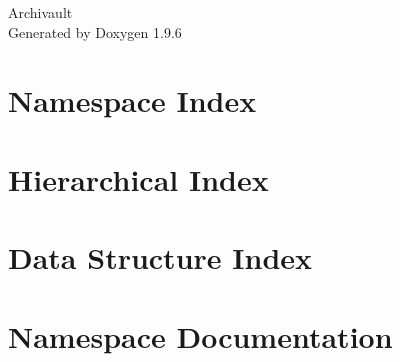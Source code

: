 \documentclass[twoside]{book}
\newcommand{\+}{\discretionary{\mbox{\scriptsize$\hookleftarrow$}}{}{}}
\newcommand{\clearemptydoublepage}{%
    \newpage{\pagestyle{empty}\cleardoublepage}%
  }
\begin{document}
  \raggedbottom
    \hypersetup{pageanchor=false,
                bookmarksnumbered=true,
                pdfencoding=unicode
               }
  \begin{titlepage}
  \vspace*{7cm}
  \begin{center}%
  {\Large Archivault}\\
  \vspace*{1cm}
  {\large Generated by Doxygen 1.9.6}\\
  \end{center}
  \end{titlepage}
  \clearemptydoublepage
  \tableofcontents
  \clearemptydoublepage
  \hypersetup{pageanchor=true}
\chapter{Namespace Index}

\chapter{Hierarchical Index}

\chapter{Data Structure Index}

\chapter{Namespace Documentation}

\end{document}
